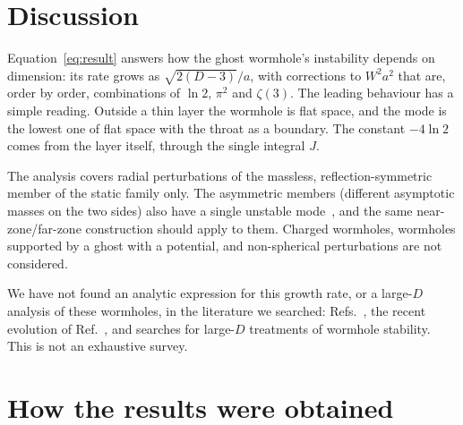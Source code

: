 \documentclass[11pt]{article}
\theoremstyle{remark}
\begin{document}
\section{Discussion}\label{sec:discussion}

Equation~\eqref{eq:result} answers how the ghost wormhole's instability depends on dimension: its rate grows as
$\sqrt{2(D-3)}/a$, with corrections to $W^2a^2$ that are, order by order, combinations of $\ln2$, $\pi^2$ and $\zeta(3)$. The leading behaviour has a
simple reading. Outside a thin layer the wormhole is flat space, and the mode is the lowest one of flat space with the
throat as a boundary. The constant $-4\ln2$ comes from the layer itself, through the single integral $J$.

The analysis covers radial perturbations of the massless, reflection-symmetric member of the static family only. The
asymmetric members (different asymptotic masses on the two sides) also have a single unstable mode~\cite{GGS2009a},
and the same near-zone/far-zone construction should apply to them. Charged wormholes, wormholes supported by a ghost
with a potential, and non-spherical perturbations are not considered.

We have not found an analytic expression for this growth rate, or a large-$D$ analysis of these wormholes, in the
literature we searched: Refs.~\cite{TS2013,ST2017,GGS2009a,GGS2009b,SH2002}, the recent evolution of
Ref.~\cite{XCY2025}, and searches for large-$D$ treatments of wormhole stability. This is not an exhaustive survey.

\section{How the results were obtained}\label{sec:method}
\end{document}
